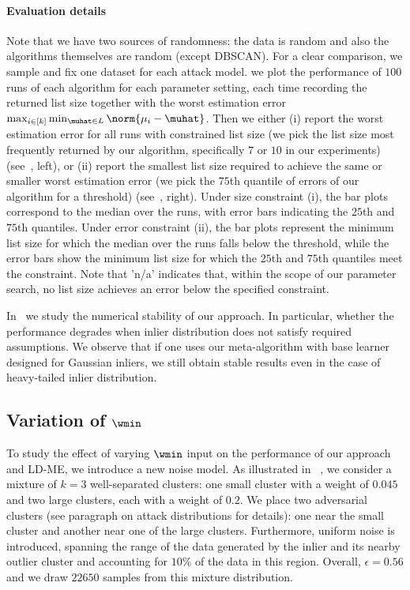 \paragraph{Evaluation details} 
Note that we have two sources of randomness: the data is random and also the algorithms themselves are random (except DBSCAN). For a clear comparison, we sample and fix one dataset for each attack model. 
we plot the performance of 
\(100\) runs of each algorithm for each parameter setting, %
each time recording the returned list size together with the worst estimation error \(\max_{i \in [k]} \min_{\muhat \in L} \norm{\mu_i - \muhat}\). Then we either (i) report the worst estimation error for all runs with constrained list size (we pick the list size most frequently returned by our algorithm, specifically \(7\) or \(10\) in our experiments) (see~, left), or (ii) report the smallest list size required to achieve the same or smaller worst estimation error (we pick the \(75\)th quantile of errors of our algorithm for a threshold) (see~, right).
Under size constraint (i), the bar plots correspond to the median over the runs, with error bars indicating  the \(25\)th and \(75\)th quantiles. Under error constraint (ii), the bar plots represent the minimum list size for which the median over the runs falls below the threshold, while the error bars show the minimum list size for which the \(25\)th and \(75\)th quantiles meet the constraint. Note that 'n/a' indicates that, within the scope of our parameter search, no list size achieves an error below the specified constraint.

In~ we study the numerical stability of our approach. In particular, whether the performance degrades when inlier distribution does not satisfy required assumptions. We observe that if one uses our meta-algorithm with base learner designed for Gaussian inliers, we still obtain stable results even in the case of heavy-tailed inlier distribution.

\subsection{Variation of \(\wmin\)}
\label{sec:app-wlow}
To study the effect of varying \(\wmin\) input on the performance of our approach and LD-ME, we introduce a new noise model. As illustrated in ~, we consider a mixture of \(k = 3\) well-separated clusters: one small cluster with a weight of \(0.045\) and two large clusters, each with a weight of \(0.2\). We place two adversarial clusters (see paragraph on attack distributions for details): one near the small cluster and another near one of the large clusters. Furthermore, uniform noise is introduced, spanning the range of the data generated by the inlier and its nearby outlier cluster and accounting for \(10\%\) of the data in this region. Overall, \(\epsilon = 0.56\) and we draw \(22650\) samples from this mixture distribution.

